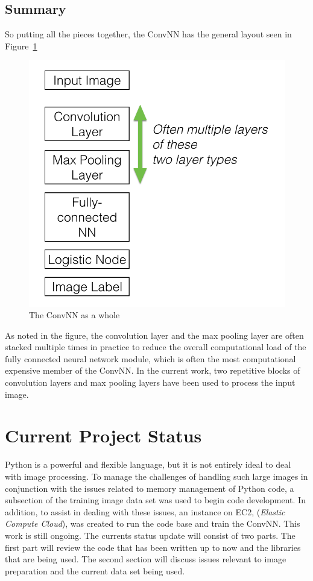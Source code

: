 \documentclass[letterpaper,12pt]{article}
\newcommand{\figref}[1]{Figure~\ref{#1}}
\begin{document}
\subsection{Summary}

So putting all the pieces together,  the ConvNN has the general layout seen in \figref{summary}

\begin{figure}[htbp]
\begin{center}
\includegraphics[scale=0.6]{images/summaryNN.png}
\caption{The ConvNN as a whole}
\label{summary}
\end{center}
\end{figure}

As noted in the figure, the convolution layer and the max pooling layer are often stacked multiple times in practice to reduce the overall computational load of the fully connected neural network module, which is often the most computational expensive member of the ConvNN. In the current work, two repetitive blocks of convolution layers and max pooling layers have been used to process the input image.

\section{Current Project Status}

Python is a powerful and flexible language, but it is not entirely ideal to deal with image processing. To manage the challenges of handling such large images in conjunction with the issues related to memory management of Python code, a subsection of the training image data set was used to begin code development. In addition, to assist in dealing with these issues, an instance on EC2, (\textit{Elastic Compute Cloud}), was created to run the code base and train the ConvNN. This work is still ongoing. The currents status update will consist of two parts. The first part will review the code that has been written up to now and the libraries that are being used. The second section will discuss issues relevant to image preparation and the current data set being used. 
\end{document}
